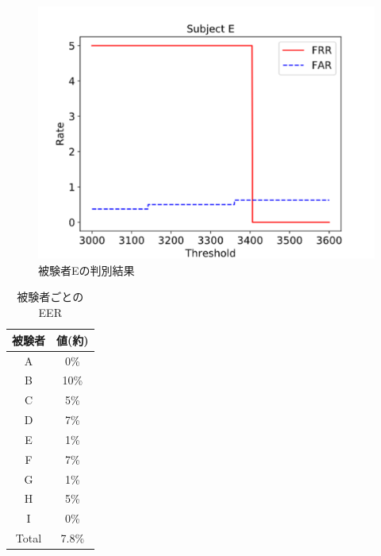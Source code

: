 \documentclass[a4j]{jarticle}%
\begin{document}
\begin{figure}[!t]
  \begin{center}
    \includegraphics[width=1\linewidth]{tex_fig/subject_E.eps}
  \end{center}
    \vspace{-8mm}
  \caption{被験者Eの判別結果}
  \label{subject_E}
\end{figure}

\begin{table}[htb]
  \center
  \begin{tabular}{|c|c|} \hline
    被験者 & 値(約) \\ \hline
    A & 0\% \\
    B & 10\% \\
    C & 5\% \\
    D & 7\% \\
    E & 1\% \\
    F & 7\% \\
    G & 1\% \\
    H & 5\% \\
    I & 0\% \\ \hline
    Total & 7.8\% \\ \hline
  \end{tabular}
  \caption{被験者ごとのEER}
  \label{EER_num}
\end{table}
\end{document}
